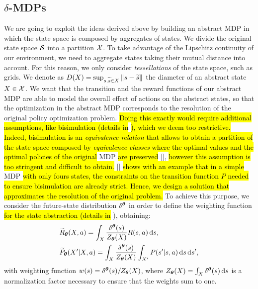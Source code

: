 \subsection{$\delta$-\ac{MDPs}}
We are going to exploit the ideas derived above by building an abstract \ac{MDP} in which the state space is composed by aggregates of states. We divide the original state space $\mathcal{S}$ into a partition $\mathcal{X}$. To take advantage of the Lipschitz continuity of our environment, we need to aggregate states taking their mutual distance into account. For this reason, we only consider \textit{tessellations} of the state space, such as grids. 
%
We denote as $D(X) = \sup_{s,\widetilde{s}\in X}\left\|s-\widetilde{s}\right\|_{}$ the diameter of an abstract state $X\in\mathcal{X}$.
We want that the transition and the reward functions of our abstract MDP are able to model the overall effect of actions on the abstract states, so that the optimization in the abstract \ac{MDP} corresponds to the resolution of the original policy optimization problem. \hl{Doing this exactly would require additional assumptions, like bisimulation (details in} \hl{), which we deem too restrictive. Indeed, bisimulation is an \emph{equivalence relation} that allows to obtain a partition of the state space composed by \emph{equivalence classes} where the optimal values and the optimal policies of the original} \ac{MDP} \hl{are preserved} [\cite{givan2003equivalence}], \hl{however this assumption is too stringent and difficult to obtain.} [\cite{ferns2012metrics}] \hl{shows with an example that in a simple} \ac{MDP} \hl{with only fours states, the constraints on the transition function $P$ needed to ensure bisimulation are already strict. Hence, we design a solution that approximates the resolution of the original problem.} To achieve this purpose, we consider the future-state distribution $\delta^{\boldsymbol{\theta}}$ in order to define the weighting function \hl{for the state abstraction (details in} ), obtaining:
%
\begin{align}
	&\widetilde{R}_{\boldsymbol{\theta}}(X,a) = \int_{X}\frac{\delta^{\boldsymbol{\theta}}(s)}{Z_{\boldsymbol{\theta}}(X)}R(s,a)\,\mathrm{d} s,\label{eq:abrew2} \\
	&\widetilde{P}_{\boldsymbol{\theta}}(X'|X,a) = \int_{X} \frac{\delta^{\boldsymbol{\theta}}(s)}{Z_{\boldsymbol{\theta}}(X)} \int_{X'} P(s'|s,a)\,\mathrm{d} s\,\mathrm{d} s',\label{eq:abtran2}
\end{align}
%
\sloppy with weighting function $w(s)=\delta^{\boldsymbol{\theta}}(s)/Z_{\boldsymbol{\theta}}(X)$, where $Z_{\boldsymbol{\theta}}(X)=\int_{X}\delta^{\boldsymbol{\theta}}(s)\,\mathrm{d} s$ is a normalization factor necessary to ensure that the weights sum to one.
